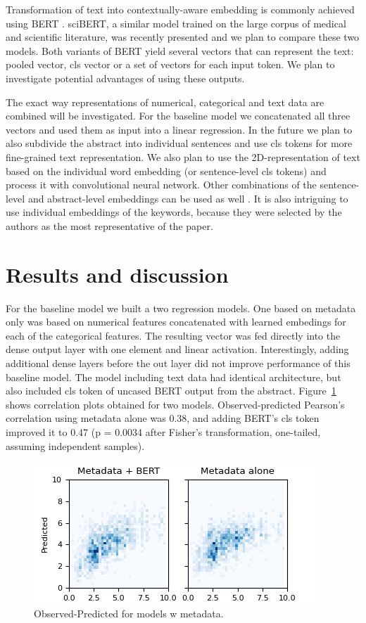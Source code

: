 \documentclass[11pt]{article}
\begin{document}
Transformation of text into contextually-aware embedding is commonly achieved using BERT \citep{DBLP:journals/corr/abs-1810-04805}. sciBERT, a similar model trained on the large corpus of medical and scientific literature, was recently presented \citep{DBLP:journals/corr/abs-1903-10676} and we plan to compare these two models. Both variants of BERT yield several vectors that can represent the text: pooled vector, cls vector or a set of vectors for each input token. We plan to investigate potential advantages of using these outputs. 

The exact way representations of numerical, categorical and text data are combined will be investigated. For the baseline model we concatenated all three vectors and used them as input into a linear regression. In the future we plan to also subdivide the abstract into individual sentences and use cls tokens for more fine-grained text representation. We also plan to use the 2D-representation of text based on the individual word embedding (or sentence-level cls tokens) and process it with convolutional  neural network. Other combinations of the sentence-level and abstract-level embeddings can be used as well \citep{hs2022}. It is also intriguing to use individual embeddings of the keywords, because they were selected by the authors as the most representative of the paper.

\section{Results and discussion}
For the baseline model we built a two regression models. One based on metadata only was based on numerical features concatenated with learned embedings for each of the categorical features. The resulting vector was fed directly into the dense output layer with one element and linear activation. Interestingly, adding additional dense layers before the out layer did not improve performance of this baseline model. The model including text data had identical architecture, but also included cls token of uncased BERT output from the abstract. Figure~\ref{fig:meta_no_meta} shows correlation plots obtained for two models. Observed-predicted Pearson's correlation using metadata alone was 0.38, and adding BERT's cls token improved it to 0.47 (p = 0.0034 after Fisher's transformation, one-tailed, assuming independent samples). 
\begin{figure}
	\includegraphics[width= \columnwidth]{./Images/Metadata w BERT.png}
	\caption{Observed-Predicted for models w metadata.}
	\label{fig:meta_no_meta}
\end{figure}
\end{document}
